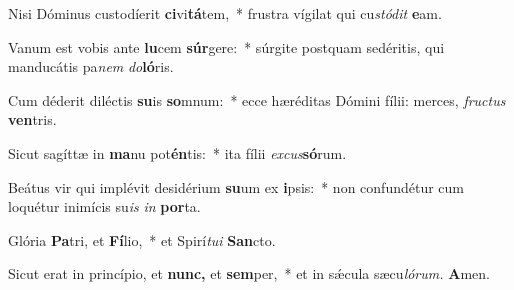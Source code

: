 \item Nisi Dóminus custodíerit \textbf{ci}vi\textbf{tá}tem,~* frustra vígilat qui cu\tinyhspace\textit{stódit} \textbf{e}am.
\item Vanum est vobis ante \textbf{lu}cem \textbf{súr}gere:~* súrgite postquam sedéritis, qui manducátis pa\tinyhspace\textit{nem} \textit{do}\textbf{ló}ris.
\item Cum déderit diléctis \textbf{su}is \textbf{so}mnum:~* ecce hæréditas Dómini fílii: merces, \textit{fru\-ctus} \textbf{ven}tris.
\item Sicut sagíttæ in \textbf{ma}nu pot\textbf{én}tis:~* ita fílii \textit{excus}\textbf{só}rum.
\item Beátus vir qui implévit desidérium \textbf{su}um ex \textbf{i}psis:~* non confundétur cum loquétur inimícis su\tinyhspace\textit{is} \textit{in} \textbf{por}ta.
\item Glória \textbf{Pa}tri, et \textbf{Fí}lio,~* et Spirí\tinyhspace\textit{tu}\textit{i} \textbf{San}cto.
\item Sicut erat in princípio, et \textbf{nunc,} et \textbf{sem}per,~* et in sǽcula sæcu\tinyhspace\textit{lórum.} \textbf{A}men.
